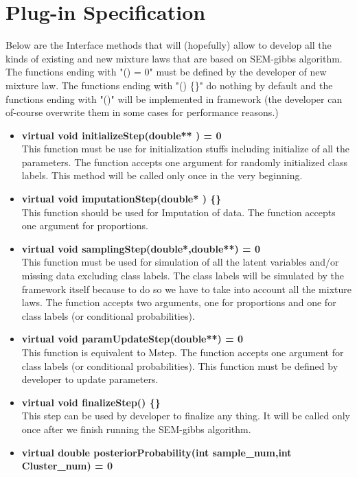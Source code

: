 \documentclass[a4paper,11pt]{article}
\begin{document}
\section{Plug-in Specification}

Below are the Interface methods that will (hopefully) allow to develop all the kinds of existing and new mixture laws that are based on SEM-gibbs algorithm. The functions ending with "() = 0" must be defined by the developer of new mixture law. The functions ending with "() \{\}" do nothing by default and the functions ending with "()" will be implemented in framework (the developer can of-course overwrite them in some cases for performance reasons.)
\begin{itemize}
\item {\bf virtual void initializeStep(double** ) = 0} \\
This function must be use for initialization stuffs including initialize of all the parameters. The function accepts one argument for randomly initialized class labels. This method will be called only once in the very beginning. 
\item {\bf virtual void imputationStep(double* ) \{\}}\\
This function should be used for Imputation of data. The function accepts one argument for proportions.
\item {\bf virtual void samplingStep(double*,double**) = 0} \\
This function must be used for simulation of all the latent variables and/or missing data  excluding class labels. The class labels will be simulated by the framework itself because to do so we have to take into account all the mixture laws. The function accepts two arguments, one for proportions and one for class labels (or conditional probabilities).
\item {\bf virtual void paramUpdateStep(double**) = 0}\\
This function is equivalent to Mstep. The function accepts one argument for class labels (or conditional probabilities). This function must be defined by developer to update parameters. 
\item {\bf virtual void finalizeStep() \{\}}\\
This step can be used by developer to finalize any thing. It will be called only once after we finish running the SEM-gibbs algorithm.
\item {\bf virtual double posteriorProbability(int sample\_num,int Cluster\_num) = 0}\\

\end{itemize}
\end{document}
